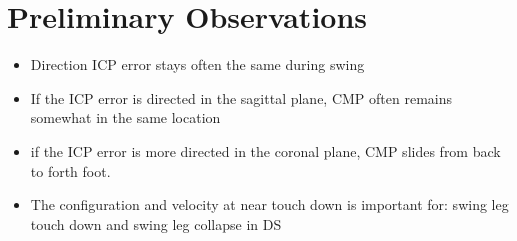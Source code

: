 \section{Preliminary Observations}
\begin{itemize}
	\item Direction \ac{ICP} error stays often the same during swing
	\item If the \ac{ICP} error is directed in the sagittal plane, CMP often remains somewhat in the same location
	\item if the \ac{ICP} error is more directed  in the coronal plane, CMP slides from back to forth foot. 
	\item The configuration and velocity at near touch down is important for: swing leg touch down and swing leg collapse in \ac{DS}
\end{itemize}

